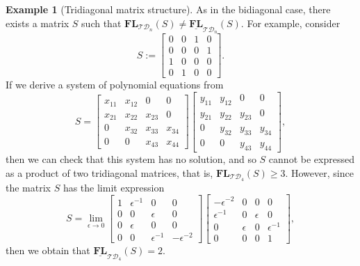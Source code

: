 \documentclass[reqno]{amsart}
\theoremstyle{definition}
\newtheorem{example}[theorem]{Example}
\numberwithin{equation}{section}
\begin{document}
\begin{example}[Tridiagonal matrix structure]
    As in the bidiagonal case, there exists a matrix $S$ such that $\mathbf{FL}_{\mathcal{TD}_n}(S) \neq \underline{\mathbf{FL}}_{\mathcal{TD}_n}(S)$. For example, consider
    \begin{equation*}
        S:=\begin{bmatrix}
            0 & 0 & 1 & 0\\
            0 & 0 & 0 & 1\\
            1 & 0 & 0 & 0\\
            0 & 1 & 0 & 0
        \end{bmatrix}.
    \end{equation*}
    If we derive a system of polynomial equations from
    \begin{equation*}
        S=\begin{bmatrix}
            x_{11} & x_{12} & 0 & 0\\
            x_{21} & x_{22} & x_{23} & 0\\
            0 & x_{32} & x_{33} & x_{34}\\
            0 &0 & x_{43} & x_{44}
        \end{bmatrix}
        \begin{bmatrix}
            y_{11} & y_{12} & 0 & 0\\
            y_{21} & y_{22} & y_{23} & 0\\
            0 & y_{32} & y_{33} & y_{34}\\
            0 &0 & y_{43} & y_{44}
        \end{bmatrix},
    \end{equation*}
    then we can check that this system has no solution, and so $S$ cannot be expressed as a product of two tridiagonal matrices, that is, $\mathbf{FL}_{\mathcal{TD}_4}(S) \geq 3$. However, since the matrix $S$ has the limit expression
    \begin{equation*}
        S=\lim_{\epsilon \rightarrow 0}\begin{bmatrix}
          1 & \epsilon^{-1} & 0 & 0 \\
          0 & 0 & \epsilon & 0\\
          0 & \epsilon & 0 & 0\\
          0 & 0 & \epsilon^{-1} & -\epsilon^{-2}
        \end{bmatrix}
        \begin{bmatrix}
         -\epsilon^{-2} & 0 & 0 & 0\\
         \epsilon^{-1} & 0 & \epsilon & 0\\
         0 & \epsilon & 0 & \epsilon^{-1}\\
         0 & 0 & 0 & 1
        \end{bmatrix},
    \end{equation*}
    then we obtain that $\underline{\mathbf{FL}}_{\mathcal{TD}_4}(S)=2$.
\end{example}
\end{document}
